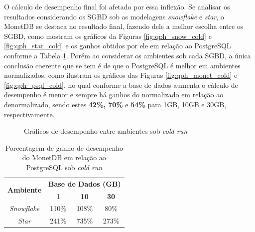 O cálculo de desempenho final foi afetado por essa inflexão. Se analisar os resultados considerando os SGBD sob as modelagens \textit{snowflake} e \textit{star}, o MonetDB se destaca no resultado final, fazendo dele a melhor escolha entre os SGBD, como mostram os gráficos da Figuras \ref{fig:qph_snow_cold} e \ref{fig:qph_star_cold} e os ganhos obtidos por ele em relação ao PostgreSQL conforme a Tabela \ref{tab:ganho_monet_psql_cold}. Porém ao considerar os ambientes sob cada SGBD, a única conclusão coerente que se tem é de que o PostgreSQL é melhor em ambientes normalizados, como ilustram os gráficos das Figuras \ref{fig:qph_monet_cold} e \ref{fig:qph_psql_cold}, no qual conforme a base de dados aumenta o cálculo de desempenho é menor e sempre há ganhos do normalizado em relação ao denormalizado, sendo estes \textbf{42\%, 70\%} e \textbf{54\%} para 1GB, 10GB e 30GB, respectivamente.

\begin{figure}[htpb]
        \centering
        \caption{Gráficos de desempenho entre ambientes sob \textit{cold run}}
        \label{fig:qph_model_cold}
\end{figure}

\begin{table}[htpb]
        \centering
        \caption{Porcentagem de ganho de desempenho do MonetDB em relação ao PostgreSQL sob \textit{cold run}}
        \label{tab:ganho_monet_psql_cold}
        \begin{tabular}{|c|c|c|c|}
        \hline
        \multirow{2}{*}{\textbf{Ambiente}} & \multicolumn{3}{c|}{\textbf{Base de Dados (GB)}} \\ \cline{2-4} 
                                           & \textbf{1}     & \textbf{10}    & \textbf{30}    \\ \hline
        \textit{Snowflake}                 & 110\%          & 108\%          & 80\%           \\ \hline
        \textit{Star}                      & 241\%          & 735\%          & 273\%          \\ \hline
        \end{tabular}
\end{table}

